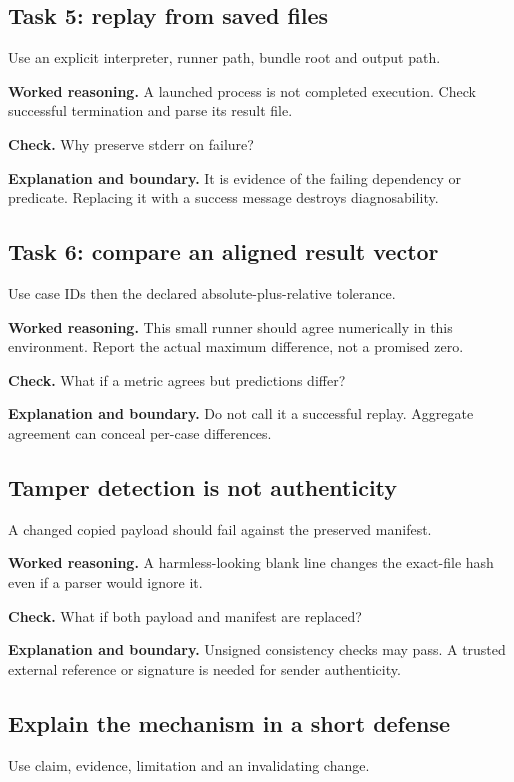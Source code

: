 \subsection{Task 5: replay from saved files}
Use an explicit interpreter, runner path, bundle root and output path.

\textbf{Worked reasoning.} A launched process is not completed execution. Check successful termination and parse its result file.

\textbf{Check.} Why preserve stderr on failure?

\textbf{Explanation and boundary.} It is evidence of the failing dependency or predicate. Replacing it with a success message destroys diagnosability.

\subsection{Task 6: compare an aligned result vector}
Use case IDs then the declared absolute-plus-relative tolerance.

\textbf{Worked reasoning.} This small runner should agree numerically in this environment. Report the actual maximum difference, not a promised zero.

\textbf{Check.} What if a metric agrees but predictions differ?

\textbf{Explanation and boundary.} Do not call it a successful replay. Aggregate agreement can conceal per-case differences.

\subsection{Tamper detection is not authenticity}
A changed copied payload should fail against the preserved manifest.

\textbf{Worked reasoning.} A harmless-looking blank line changes the exact-file hash even if a parser would ignore it.

\textbf{Check.} What if both payload and manifest are replaced?

\textbf{Explanation and boundary.} Unsigned consistency checks may pass. A trusted external reference or signature is needed for sender authenticity.

\subsection{Explain the mechanism in a short defense}
Use claim, evidence, limitation and an invalidating change.

